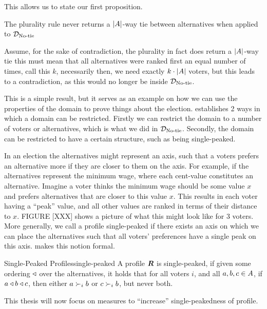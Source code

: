 This allows us to state our first proposition.

\begin{proposition}
	The plurality rule never returns a $|A|$-way tie between alternatives when applied to $\mathcal{D}_{\textnormal{No-tie}}$
\end{proposition}

\begin{proofc}
	Assume, for the sake of contradiction, the plurality in fact does
	return a $|A|$-way tie this must mean that all alternatives were ranked first an
	equal number of times, call this $k$, necessarily then, we need
	exactly $k \cdot |A|$ voters, but this leads to a
	contradiction, as this would no longer be inside $\mathcal{D}_{\textnormal{No-tie}}$.
\end{proofc}

This is a simple result, but it serves as an example on how we can use the properties of the domain to prove things about the election. \citet{gaertnerDomainRestrictions2002} establishes 2 ways in which a domain can be restricted. Firstly we can restrict the domain to a number of voters or alternatives, which is what we did in $\mathcal{D}_{\textnormal{No-tie}}$. Secondly, the domain can be restricted to have a certain structure, such as being single-peaked.


In an election the alternatives might represent an axis, such that a voters
prefers an alternative more if they are closer to them on the axis. For
example, if the alternatives represent the minimum wage, where each cent-value
constitutes an alternative. Imagine a voter thinks the minimum wage should  be
some value $x$ and prefers alternatives that are closer to this value $x$. This
results in each voter having a ``peak'' value, and all other values are ranked
in terms of their distance to $x$. FIGURE [XXX] shows a picture of what this
might look like for 3 voters. More generally, we call a profile single-peaked
if there exists an axis on which we can place the alternatives such that all
voters' preferences have a single peak on this axis. 
makes this notion formal.

\begin{definition}{Single-Peaked Profiles}{single-peaked}
	A profile $\boldsymbol{R}$ is single-peaked, if given some ordering $\triangleleft$ over the alternatives, it holds that for all voters $i$, and all $a, b, c \in A$, if $a \triangleleft b \triangleleft c$, then either $a \succ_i b$ or $c \succ_i b$, but never both.
\end{definition}

This thesis will now focus on measures to ``increase'' single-peakedness of profile.




